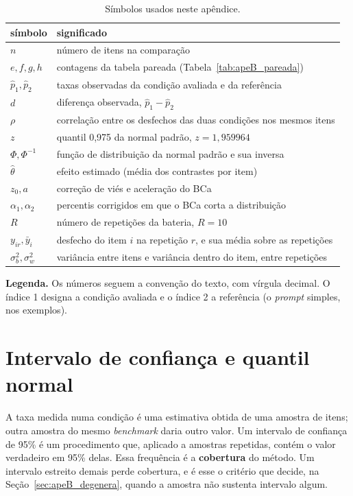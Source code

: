 \begin{table}[H]
\centering
\caption{Símbolos usados neste apêndice.}
\label{tab:apeB_simbolos}
\begin{tabular}{ll}
\toprule
símbolo & significado \\
\midrule
$n$ & número de itens na comparação \\
$e, f, g, h$ & contagens da tabela pareada (Tabela~\ref{tab:apeB_pareada}) \\
$\hat p_1, \hat p_2$ & taxas observadas da condição avaliada e da referência \\
$d$ & diferença observada, $\hat p_1 - \hat p_2$ \\
$\rho$ & correlação entre os desfechos das duas condições nos mesmos itens \\
$z$ & quantil 0,975 da normal padrão, $z = 1{,}959964$ \\
$\Phi, \Phi^{-1}$ & função de distribuição da normal padrão e sua inversa \\
$\hat\theta$ & efeito estimado (média dos contrastes por item) \\
$z_0, a$ & correção de viés e aceleração do BCa \\
$\alpha_1, \alpha_2$ & percentis corrigidos em que o BCa corta a distribuição \\
$R$ & número de repetições da bateria, $R = 10$ \\
$y_{ir}, \bar y_i$ & desfecho do item $i$ na repetição $r$, e sua média sobre as repetições \\
$\sigma_b^2, \sigma_w^2$ & variância entre itens e variância dentro do item, entre repetições \\
\bottomrule
\end{tabular}
\vspace{2pt}
\begin{minipage}{\textwidth}
\footnotesize\raggedright
\textbf{Legenda.} Os números seguem a convenção do texto, com vírgula
decimal. O índice 1 designa a condição avaliada e o índice 2 a referência
(o \textit{prompt} simples, nos exemplos).
\end{minipage}
\end{table}

\section{Intervalo de confiança e quantil normal}\label{sec:apeB_ic}

A taxa medida numa condição é uma estimativa obtida de uma amostra de itens;
outra amostra do mesmo \textit{benchmark} daria outro valor. Um intervalo de
confiança de 95\% é um procedimento que, aplicado a amostras repetidas,
contém o valor verdadeiro em 95\% delas. Essa frequência é a
\textbf{cobertura} do método. Um intervalo estreito demais perde cobertura,
e é esse o critério que decide, na Seção~\ref{sec:apeB_degenera}, quando a
amostra não sustenta intervalo algum.

